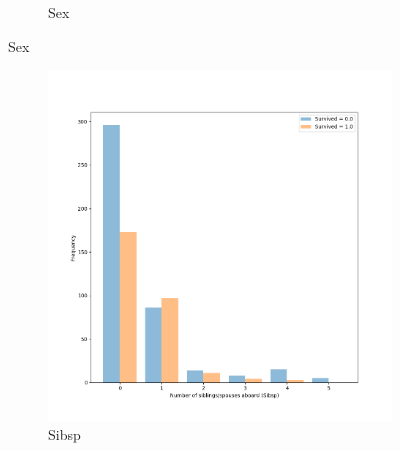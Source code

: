 \documentclass[11pt]{article}
\begin{document}
\begin{itemize}
\begin{enumerate}
\begin{figure}
\begin{subfigure}[b]{0.49\textwidth}
          \caption{Sex}
        \end{subfigure}
      \end{figure}
      \clearpage
      \begin{figure}
        \ContinuedFloat
        \centering
        \begin{subfigure}[b]{0.49\textwidth}
          \includegraphics[width=\textwidth]{figs/sibsp.png}
          \caption{Sibsp}
        \end{subfigure}
        \begin{subfigure}[b]{0.49\textwidth}

\end{subfigure}
\end{figure}
\end{enumerate}
\end{itemize}
\end{document}
